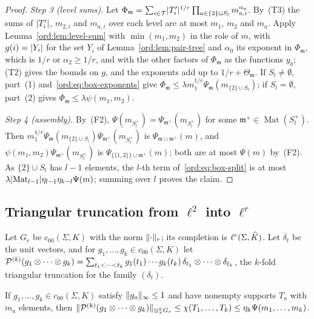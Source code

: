 \begin{proof}
\emph{Step 3 (level sums).} Let $\Phi_{\mathfrak m}=\sum_{i\in\mathcal T}\lvert T'_i\rvert^{1/r}\prod_{a\in\{2\}\cup S_l}m_{a,i}^{\alpha_a}$.
By~(T3) the sums of $\lvert T'_i\rvert$, $m_{2,i}$ and $m_{a,i}$ over each level are at most $m_1$, $m_2$ and $m_a$. Apply
Lemma~\ref{ord:lem:level-sum} with $\min(m_1,m_2)$ in the role of $m$, with $g(i)=\lvert Y_i\rvert$ for the set $Y_i$ of
Lemma~\ref{ord:lem:pair-tree} and $\alpha_0$ its exponent in $\Phi_{\mathfrak m}$, which is $1/r$ or $\alpha_2\ge1/r$,
and with the other factors of $\Phi_{\mathfrak m}$ as the functions $y_b$; (T2) gives the bounds on $g$, and the
exponents add up to $1/r+\Theta_{\mathfrak m}$. If $S_l\ne\emptyset$, part~(1) and~\eqref{ord:eq:box-exponents} give
$\Phi_{\mathfrak m}\le\lambda m_1^{1/r}\Psi_{\mathfrak m}(m_{\{2\}\cup S_l})$; if $S_l=\emptyset$, part~(2) gives
$\Phi_{\mathfrak m}\le\lambda\psi(m_1,m_2)$.

\emph{Step 4 (assembly).} By~(F2), $\Psi(m_{S_l^+})=\Psi_{\mathfrak m^+}(m_{S_l^+})$ for some
$\mathfrak m^+\in\operatorname{Mat}(S_l^+)$. Then $m_1^{1/r}\Psi_{\mathfrak m}(m_{\{2\}\cup S_l})\Psi_{\mathfrak m^+}(m_{S_l^+})$
is $\Psi_{\mathfrak m\cup\mathfrak m^+}(m)$, and $\psi(m_1,m_2)\Psi_{\mathfrak m^+}(m_{S_l^+})$ is
$\Psi_{\{\{1,2\}\}\cup\mathfrak m^+}(m)$; both are at most $\Psi(m)$ by~(F2). As $\{2\}\cup S_l$ has $l-1$ elements, the
$l$-th term of~\eqref{ord:eq:box-split} is at most $\lambda\lvert \operatorname{Mat}_{l-1}\rvert\eta_{l-1}\eta_{k-l}\Psi(m)$;
summing over $l$ proves the claim.
\end{proof}

\subsection{Triangular truncation from \texorpdfstring{$\ell^2$}{l\textasciicircum2} into \texorpdfstring{$\ell^r$}{l\textasciicircum r}}\label{ord:ssec:triangle}

Let $G_r$ be $c_{00}(\Sigma,K)$ with the norm $\lVert \cdot\rVert_r$; its completion is $\ell^r(\Sigma,\widehat K)$. Let $\delta_t$ be the
unit vectors, and for $g_1,\dots,g_k\in c_{00}(\Sigma,K)$ let
$\mathcal P^{(k)}(g_1\otimes\dots\otimes g_k)=\sum_{t_1<\dots<t_k}g_1(t_1)\cdots g_k(t_k)\,\delta_{t_1}\otimes\dots\otimes\delta_{t_k}$,
the $k$\nobreakdash-fold triangular truncation for the family $(\delta_t)$.

\begin{lemma}\label{ord:lem:flat}
If $g_1,\dots,g_k\in c_{00}(\Sigma,K)$ satisfy $\lVert g_a\rVert_\infty\le1$ and have nonempty supports $T_a$ with $m_a$
elements, then
$\lVert \mathcal P^{(k)}(g_1\otimes\dots\otimes g_k)\rVert_{\otimes^k_\pi G_r}\le\chi(T_1,\dots,T_k)\le\eta_k\Psi(m_1,\dots,m_k)$.
\end{lemma}

